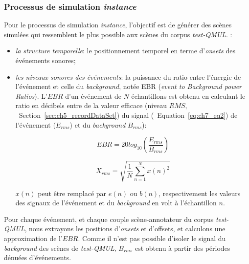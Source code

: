 
\subsubsection{Processus de simulation \emph{instance}}
\label{sec:ch7_simuProcessInstance}

Pour le processus de simulation \emph{instance}, l'objectif est de générer des scènes simulées qui ressemblent le plus possible aux scènes du corpus \emph{test-QMUL}.  :

\begin{itemize}
\item \emph{la structure temporelle}: le positionnement temporel en terme d'\emph{onsets} des événements sonores;
\item \emph{les niveaux sonores des événements}: la puissance du ratio entre l'énergie de l'événement et celle du \emph{background}, notée EBR (\emph{event to Background power Ratios}). L'$EBR$ d'un événement de $N$ échantillons est obtenu  en calculant le ratio en décibels entre de la valeur efficace (niveau $RMS$, \cf~Section~\ref{sec:ch5_recordDataSet}) du signal (\cf~Equation~\ref{eq:ch7_eq2}) de l'événement ($E_{rms}$) et du \emph{background}  $B_{rms}$):

\begin{equation}
\label{eq:ch7_eq1}
EBR=20log_{10} \left(  \dfrac{E_{rms}}{B_{rms}} \right) 
\end{equation}

\begin{equation}
\label{eq:ch7_eq2}
X_{rms}=\sqrt{\dfrac{1}{N} \sum_{n=1}^{N} x(n)^2}
\end{equation}

$x(n)$ peut être remplacé par $e(n)$ ou $b(n)$, respectivement les valeurs des signaux de l'événement et du \emph{background} en volt à l'échantillon $n$. 
\end{itemize}

Pour chaque événement, et chaque couple scène-annotateur du corpus \emph{test-QMUL}, nous extrayons les positions d'\emph{onsets} et d'{offsets}, et calculons une approximation de l'$EBR$. Comme il n'est pas possible d'isoler le signal du \emph{background} des scènes de \emph{test-QMUL}, $B_{rms}$ est obtenu à partir des périodes dénuées d'événements. \\
 
